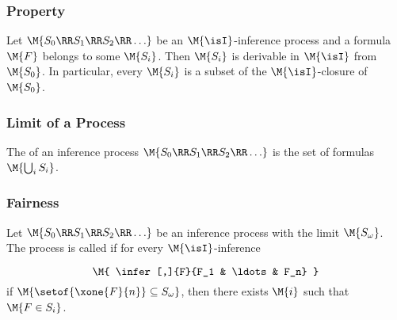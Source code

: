
	   \begin{frame}\frametitle{Property}

  Let $\M{S_0 \RR S_1 \RR S_2 \RR \ldots}$ be an $\M{\isI}$-inference process
  and a formula $\M{F}$ belongs to some $\M{S_i}$. Then $\M{S_i}$ is derivable in
  $\M{\isI}$ from $\M{S_0}$. In particular, every $\M{S_i}$ is a subset of the
  $\M{\isI}$-closure of $\M{S_0}$.


                           \end{frame}


	   \begin{frame}\frametitle{Limit of a Process}

The  of an inference process
$\M{S_0 \RR S_1 \RR S_2 \RR \ldots}$
is the set of formulas $\M{\bigcup_i S_i}$.

\medskip


\medskip


\bigskip


                           \end{frame}


	   \begin{frame}\frametitle{Fairness}

  Let $\M{S_0 \RR S_1 \RR S_2 \RR \ldots}$ be an inference process with
  the limit $\M{S_\omega}$. The process 
  is called  if for every 
  $\M{\isI}$-inference

    \[\M{
      \infer[,]{F}{F_1 & \ldots & F_n}
    }\]
  if $\M{\setof{\xone{F}{n}} \subseteq S_\omega}$, then
  there exists $\M{i}$ such that $\M{F \in S_i}$.


                           \end{frame}

